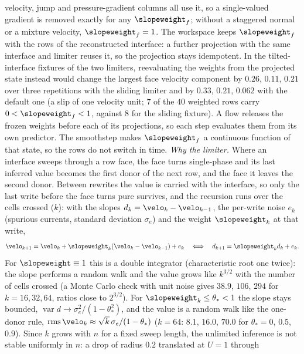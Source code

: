 velocity, jump and pressure-gradient columns all use it, so a single-valued
gradient is removed exactly for any $\slopeweight_f$; without a staggered
normal or a mixture velocity, $\slopeweight_f=1$. The workspace keeps
$\slopeweight_f$ with the rows of the reconstructed interface: a further
projection with the same interface and limiter reuses it, so the projection
stays idempotent. In the tilted-interface fixtures of the two limiters,
reevaluating the weights from the projected state instead would change the
largest face velocity component by $0.26$, $0.11$, $0.21$ over three
repetitions with the sliding limiter and by $0.33$, $0.21$, $0.062$ with the
default one (a slip of one velocity unit; $7$ of the $40$ weighted rows carry
$0<\slopeweight_f<1$, against $8$ for the sliding fixture).
A flow releases the frozen weights before each of its
projections, so each step evaluates them from its own predictor. The
smoothstep makes $\slopeweight_f$ a continuous function of that state, so the
rows do not switch in time.
\emph{Why the limiter.} Where an interface sweeps through a row face, the face
turns single-phase and its last inferred value becomes the first donor of the
next row, and the face it leaves the second donor. Between rewrites the
value is carried with the interface, so only the last write before the face
turns pure survives, and the recursion runs over the cells crossed ($k$):
with the slopes $d_k=\velo_k-\velo_{k-1}$, the per-write noise $e_k$ (spurious
currents, standard deviation $\sigma_e$) and the weight $\slopeweight_k$ at that write,
\begin{equation}\label{eq:projection:wake-recursion}
  \velo_{k+1}=\velo_k+\slopeweight_k(\velo_k-\velo_{k-1})+e_k
  \quad\Longleftrightarrow\quad
  d_{k+1}=\slopeweight_kd_k+e_k .
\end{equation}
For $\slopeweight\equiv1$ this is a double integrator (characteristic root one
twice): the slope performs a random walk and the value grows like $k^{3/2}$
with the number of cells crossed (a Monte Carlo check with unit noise gives
$38.9$, $106$, $294$ for $k=16,32,64$, ratios close to $2^{3/2}$). For
$\slopeweight_k\le\theta_\ast<1$ the slope stays bounded,
$\operatorname{var}d\to\sigma_e^2/(1-\theta_\ast^2)$, and the value is a
random walk like the one-donor rule, $\operatorname{rms}\velo_k\approx\sqrt{k}\,\sigma_e/(1-\theta_\ast)$
($k=64$: $8.1$, $16.0$, $70.0$ for $\theta_\ast=0$, $0.5$, $0.9$). Since
$k$ grows with $n$ for a fixed sweep length, the unlimited inference is not
stable uniformly in $n$: a drop of radius $0.2$ translated at $U=1$ through
